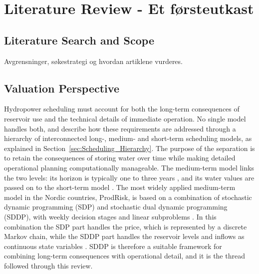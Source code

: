 
\section{Literature Review - Et førsteutkast}

\subsection{Literature Search and Scope}
Avgrensninger, søkestrategi og hvordan artiklene vurderes.

\subsection{Valuation Perspective}

Hydropower scheduling must account for both the long-term consequences of reservoir use and the technical details of immediate operation. No single model handles both, and \textcite{helseth2020scheduling} describe how these requirements are addressed through a hierarchy of interconnected long-, medium- and short-term scheduling models, as explained in Section~\ref{sec:Scheduling_Hierarchy}. The purpose of the separation is to retain the consequences of storing water over time while making detailed operational planning computationally manageable. The medium-term model links the two levels: its horizon is typically one to three years \parencite{helseth2016}, and its water values are passed on to the short-term model \parencite{helseth2020scheduling}. The most widely applied medium-term model in the Nordic countries, ProdRisk, is based on a combination of stochastic dynamic programming (SDP) and stochastic dual dynamic programming (SDDP), with weekly decision stages and linear subproblems \parencite{helseth2020scheduling}. In this combination the SDP part handles the price, which is represented by a discrete Markov chain, while the SDDP part handles the reservoir levels and inflows as continuous state variables \parencite{helseth2016}. SDDP is therefore a suitable framework for combining long-term consequences with operational detail, and it is the thread followed through this review.

